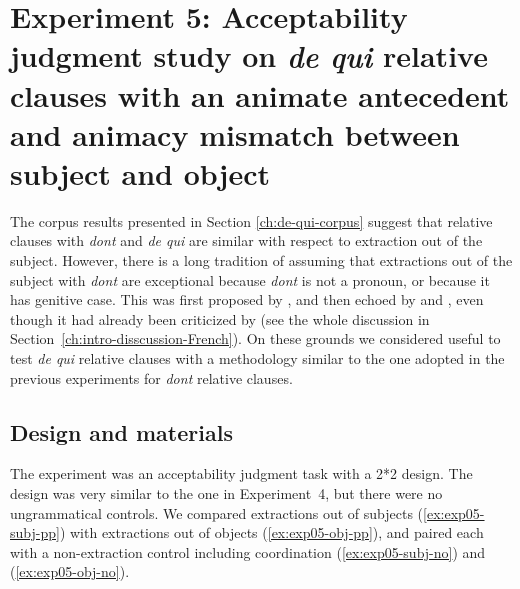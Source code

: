 \section[head=Experiment 5]{Experiment 5: Acceptability judgment study on \emph{de qui} relative clauses with an animate antecedent and animacy mismatch between subject and object}

The corpus results presented in Section \ref{ch:de-qui-corpus} suggest that relative clauses with \emph{dont} and \emph{de qui} are similar with respect to extraction out of the subject. However, there is a long tradition of assuming that extractions out of the subject with \emph{dont} are exceptional because \emph{dont} is not a pronoun, or because it has genitive case. This was first proposed by \citet{Tellier.1990,Tellier.1991}, and then echoed by \citet{Stepanov.2007} and \citet{Heck.2009}, even though it had already been criticized by \citet{Godard.1988} (see the whole discussion in Section~\ref{ch:intro-disscussion-French}). On these grounds we considered useful to test \emph{de qui} relative clauses with a methodology similar to the one adopted in the previous experiments for \emph{dont} relative clauses. 

\subsection{Design and materials}
The experiment was an acceptability judgment task with a 2*2 design. The design was very similar to the one in Experiment~4, but there were no ungrammatical controls. We compared extractions out of subjects (\ref{ex:exp05-subj-pp}) with extractions out of objects (\ref{ex:exp05-obj-pp}), and paired each with a non-extraction control including coordination (\ref{ex:exp05-subj-no}) and (\ref{ex:exp05-obj-no}).

\eal 
{}
\label{ex:exp05-subj-pp}
\label{ex:exp05-obj-pp}
\zl 

